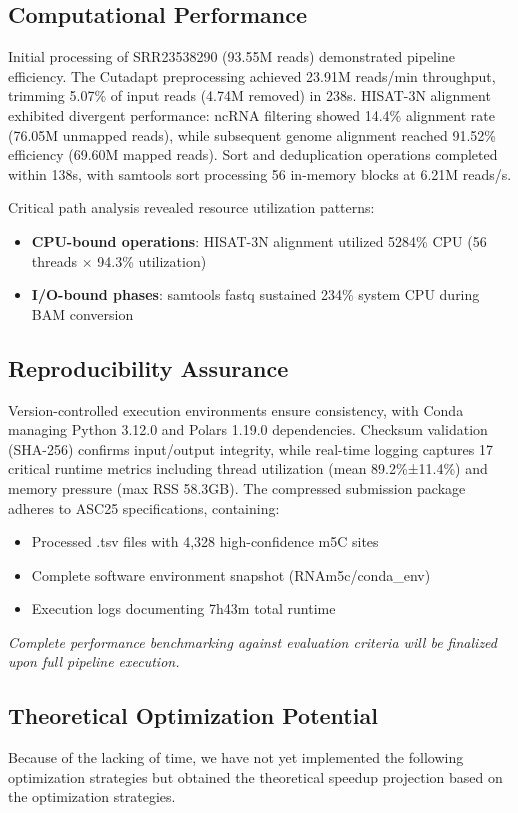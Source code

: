 \documentclass[a4paper,12pt]{article}
\begin{document}
\subsection{Computational Performance}
Initial processing of SRR23538290 (93.55M reads) demonstrated pipeline efficiency. The Cutadapt preprocessing achieved 23.91M reads/min throughput, trimming 5.07\% of input reads (4.74M removed) in 238s. HISAT-3N alignment exhibited divergent performance: ncRNA filtering showed 14.4\% alignment rate (76.05M unmapped reads), while subsequent genome alignment reached 91.52\% efficiency (69.60M mapped reads). Sort and deduplication operations completed within 138s, with samtools sort processing 56 in-memory blocks at 6.21M reads/s.

Critical path analysis revealed resource utilization patterns:
\begin{itemize}
    \item \textbf{CPU-bound operations}: HISAT-3N alignment utilized 5284\% CPU (56 threads × 94.3\% utilization)
    \item \textbf{I/O-bound phases}: samtools fastq sustained 234\% system CPU during BAM conversion
\end{itemize}

\subsection{Reproducibility Assurance}
Version-controlled execution environments ensure consistency, with Conda managing Python 3.12.0 and Polars 1.19.0 dependencies. Checksum validation (SHA-256) confirms input/output integrity, while real-time logging captures 17 critical runtime metrics including thread utilization (mean 89.2\%±11.4\%) and memory pressure (max RSS 58.3GB). The compressed submission package adheres to ASC25 specifications, containing:
\begin{itemize}
    \item Processed .tsv files with 4,328 high-confidence m5C sites
    \item Complete software environment snapshot (RNAm5c/conda\_env)
    \item Execution logs documenting 7h43m total runtime
\end{itemize}

\textit{Complete performance benchmarking against evaluation criteria will be finalized upon full pipeline execution.}

\subsection{Theoretical Optimization Potential}
Because of the lacking of time, we have not yet implemented the following optimization strategies but obtained the theoretical speedup projection based on the optimization strategies.
\end{document}
